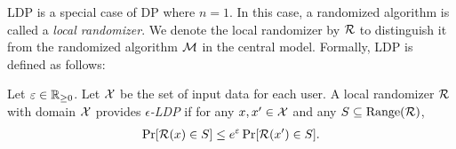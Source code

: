 LDP \cite{Kasiviswanathan_FOCS08} is a special case of DP where $n=1$. 
In this case, a randomized algorithm is called a \textit{local randomizer}. 
We denote the local randomizer by $\mathcal{R}$ to distinguish it from the randomized algorithm $\mathcal{M}$ in the central model. 
Formally, LDP is defined as follows: 
\begin{definition}  \label{chap3-def:LDP} 
Let $\varepsilon \in \mathbb{R}_{\ge0}$. 
Let $\mathcal{X}$ be the set of input data for each user. 
A local randomizer $\mathcal{R}$ with domain $\mathcal{X}$ 
provides \emph{$\epsilon$-LDP} if for any $x,x' \in \mathcal{X}$ and any $S \subseteq \mathrm{Range}(\mathcal{R})$, 
\begin{align}
\Pr[\mathcal{R}(x) \in S] \leq e^\varepsilon \Pr[\mathcal{R}(x') \in S].
\label{chap3-eq:LDP}
\end{align}
\end{definition}

